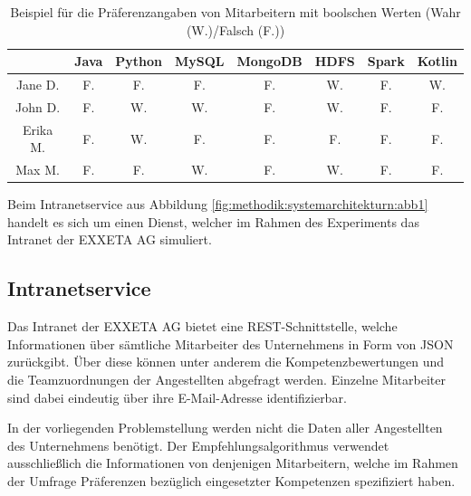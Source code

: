 \begin{table}[h]
	\centering
	\begin{tabular}{c|c|c|c|c|c|c|c}
		& Java & Python & MySQL & MongoDB & HDFS & Spark & Kotlin\\
		\hline
		Jane D. & \cellcolor{usercolor}F. & \cellcolor{usercolor}F. & \cellcolor{usercolor}F. & \cellcolor{usercolor}F. & \cellcolor{itemcolor}W. & \cellcolor{usercolor}F. & \cellcolor{itemcolor}W.\\
		John D. & \cellcolor{usercolor}F. & \cellcolor{itemcolor}W. & \cellcolor{itemcolor}W. & \cellcolor{usercolor}F. & \cellcolor{itemcolor}W. & \cellcolor{usercolor}F. & \cellcolor{usercolor}F.\\
		Erika M. & \cellcolor{usercolor}F. & \cellcolor{itemcolor}W. & \cellcolor{usercolor}F. & \cellcolor{usercolor}F. & \cellcolor{usercolor}F. & \cellcolor{usercolor}F. & \cellcolor{usercolor}F.\\
		Max M. & \cellcolor{usercolor}F. & \cellcolor{usercolor}F. & \cellcolor{itemcolor}W. & \cellcolor{usercolor}F. & \cellcolor{itemcolor}W. & \cellcolor{usercolor}F. & \cellcolor{usercolor}F.
	\end{tabular}
	\caption{Beispiel für die Präferenzangaben von Mitarbeitern mit boolschen Werten (Wahr (W.)/Falsch (F.))}
	\label{tbl:methodik:versuchsaufbau:systemarchitektur:tbl1}
\end{table}

Beim Intranetservice aus Abbildung \ref{fig:methodik:systemarchitekturn:abb1} handelt es sich um einen Dienst, welcher im Rahmen des Experiments das Intranet der EXXETA AG simuliert.

\subsection{Intranetservice}
\label{ch:methodik:versuchsaufbau:systemarchitektur:intranetservice}
Das Intranet der EXXETA AG bietet eine REST-Schnittstelle, welche Informationen über sämtliche Mitarbeiter des Unternehmens in Form von JSON zurückgibt. Über diese können unter anderem die Kompetenzbewertungen und die Teamzuordnungen der Angestellten abgefragt werden. Einzelne Mitarbeiter sind dabei eindeutig über ihre E-Mail-Adresse identifizierbar.

In der vorliegenden Problemstellung werden nicht die Daten aller Angestellten des Unternehmens benötigt. Der Empfehlungsalgorithmus verwendet ausschließlich die Informationen von denjenigen Mitarbeitern, welche im Rahmen der Umfrage Präferenzen bezüglich eingesetzter Kompetenzen spezifiziert haben.

